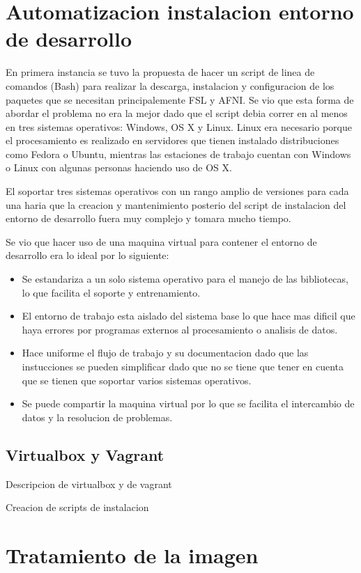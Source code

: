 \documentclass{article}
\begin{document}
\section{Automatizacion instalacion entorno de desarrollo}
En primera instancia se tuvo la propuesta de hacer un script de linea de comandos (Bash) para realizar la descarga, instalacion y configuracion de los paquetes que se necesitan principalemente FSL y AFNI. Se vio que esta forma de abordar el problema no era la mejor dado que el script debia correr en al menos en tres sistemas operativos: Windows, OS X y Linux. Linux era necesario porque el procesamiento es realizado en servidores que tienen instalado distribuciones como Fedora o Ubuntu, mientras las estaciones de trabajo cuentan con Windows o Linux con algunas personas haciendo uso de OS X.

El soportar tres sistemas operativos con un rango amplio de versiones para cada una haria que la creacion y mantenimiento posterio del script de instalacion del entorno de desarrollo fuera muy complejo y tomara mucho tiempo.

Se vio que hacer uso de una maquina virtual para contener el entorno de desarrollo era lo ideal por lo siguiente:

\begin{itemize}
\item Se estandariza a un solo sistema operativo para el manejo de las bibliotecas,
  lo que facilita el soporte y entrenamiento.
\item El entorno de trabajo esta aislado del sistema base lo que hace mas dificil que haya errores por
  programas externos al procesamiento o analisis de datos.
\item Hace uniforme el flujo de trabajo y su documentacion dado que las instucciones se pueden simplificar
  dado que no se tiene que tener en cuenta que se tienen que soportar varios sistemas operativos.
\item Se puede compartir la maquina virtual por lo que se facilita el intercambio de datos y la resolucion de problemas.
\end{itemize}

\subsection{Virtualbox y Vagrant}

Descripcion de virtualbox y de vagrant

Creacion de scripts de instalacion

\section{Tratamiento de la imagen}
\end{document}
